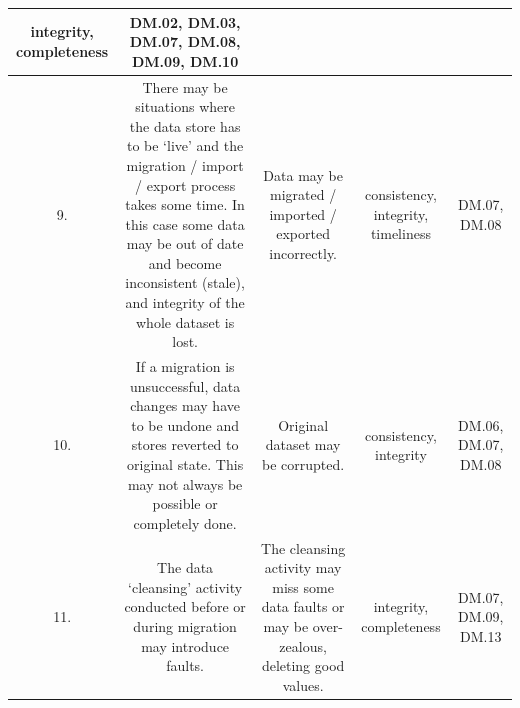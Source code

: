 \begin{longtable}{|C{}|C{}|C{}|C{}|C{}|}
\Gls{integrity}, \gls{completeness}&
DM.02, DM.03, DM.07, DM.08, DM.09, DM.10\\\hline
%
9.&
There may be situations where the data store has to be ‘live’ and the migration / import / export process takes some time.
In this case some data may be out of date and become inconsistent (stale), and \gls{integrity} of the whole \gls{dataset} is lost.&
Data may be migrated / imported / exported incorrectly.&
\Gls{consistency}, \gls{integrity}, \gls{timeliness}&
DM.07, DM.08\\\hline
%
10.&
If a migration is unsuccessful, data changes may have to be undone and stores reverted to original state.
This may not always be possible or completely done.&
Original \gls{dataset} may be corrupted.&
\Gls{consistency}, \Gls{integrity}&
DM.06, DM.07, DM.08\\\hline
%
11.&
The data ‘cleansing’ activity conducted before or during migration may introduce faults.&
The cleansing activity may miss some data faults or may be over-zealous, deleting good values.&
\Gls{integrity}, \gls{completeness}&
DM.07, DM.09, DM.13\\\hline
\end{longtable}
